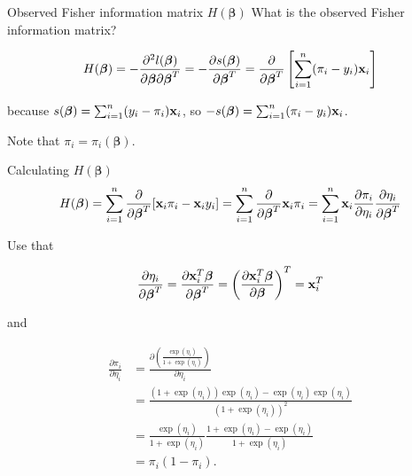 \documentclass[
  ignorenonframetext,
]{beamer}
\begin{document}
\begin{frame}
\begin{block}{Observed Fisher information matrix
\(H(\boldsymbol{\beta})\)}
\label{observed-fisher-information-matrix-hboldsymbolbeta}
What is the observed Fisher information matrix?

\[H(\boldsymbol{\beta}) = -\frac{\partial^2l(\boldsymbol{\beta})}{\partial\boldsymbol{\beta}\partial\boldsymbol{\beta}^T} = -\frac{\partial s(\boldsymbol{\beta})}{\partial\boldsymbol{\beta}^T} = \frac{\partial}{\partial\boldsymbol{\beta}^T}\left[\sum_{i=1}^n (\pi_i-y_i){\bf x}_i \right] \]

because \(s(\boldsymbol{\beta}) = \sum_{i=1}^n (y_i-\pi_i){\bf x}_i\),
so \(-s(\boldsymbol{\beta}) = \sum_{i=1}^n (\pi_i-y_i){\bf x}_i\).

Note that \(\pi_i = \pi_i(\boldsymbol{\beta})\).
\end{block}
\end{frame}

\begin{frame}
\begin{block}{Calculating \(H(\boldsymbol{\beta})\)}
\label{calculating-hboldsymbolbeta}
\[H(\boldsymbol{\beta}) = \sum_{i=1}^n \frac{\partial}{\partial\boldsymbol{\beta}^T}[{\bf x}_i\pi_i-{\bf x}_iy_i] = \sum_{i=1}^n \frac{\partial}{\partial\boldsymbol{\beta}^T}{\bf x}_i\pi_i = \sum_{i=1}^n {\bf x}_i \frac{\partial \pi_i}{\partial \eta_i} \frac{\partial \eta_i}{\partial \boldsymbol{\beta}^T} \]
\end{block}
\end{frame}

\begin{frame}
Use that

\[ \frac{\partial \eta_i}{\partial \boldsymbol{\beta}^T}=\frac{\partial {\bf x}_i^T\boldsymbol{\beta}}{\partial \boldsymbol{\beta}^T} = \left(\frac{\partial {\bf x}_i^T\boldsymbol{\beta}}{\partial \boldsymbol{\beta}}\right)^T = {\bf x}_i^T \]

and

\[
\begin{aligned}
\frac{\partial \pi_i}{\partial \eta_i} &=  \frac{\partial\left(\frac{\exp(\eta_i)}{1+\exp(\eta_i)}\right)}{\partial \eta_i}\\ &= \frac{(1+\exp(\eta_i))\exp(\eta_i) - \exp(\eta_i)\exp(\eta_i)}{(1+\exp(\eta_i))^2} \\
&= \frac{\exp(\eta_i)}{1+\exp(\eta_i)} \frac{1+\exp(\eta_i)-\exp(\eta_i)}{1+\exp(\eta_i)} \\
&=\pi_i (1-\pi_i).
\end{aligned}
\]
\end{frame}
\end{document}
